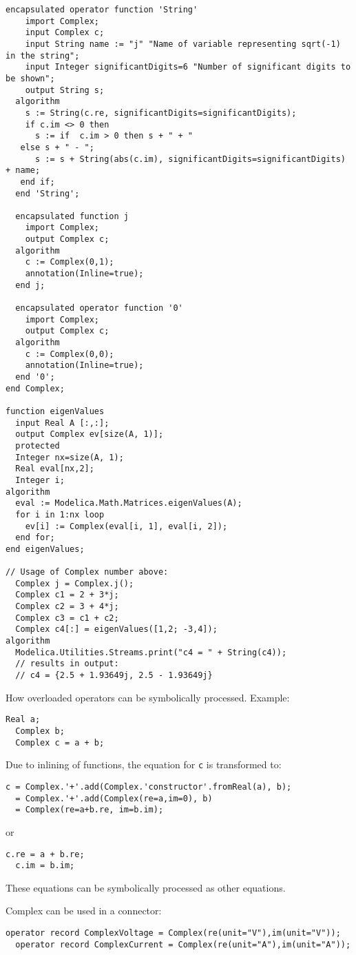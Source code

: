\begin{example}
\begin{lstlisting}[language=modelica,escapechar=!]
  encapsulated operator function 'String'
    import Complex;
    input Complex c;
    input String name := "j" "Name of variable representing sqrt(-1) in the string";
    input Integer significantDigits=6 "Number of significant digits to be shown";
    output String s;
  algorithm
    s := String(c.re, significantDigits=significantDigits);
    if c.im <> 0 then
      s := if  c.im > 0 then s + " + "
   else s + " - ";
      s := s + String(abs(c.im), significantDigits=significantDigits) + name;
   end if;
  end 'String';

  encapsulated function j
    import Complex;
    output Complex c;
  algorithm
    c := Complex(0,1);
    annotation(Inline=true);
  end j;

  encapsulated operator function '0'
    import Complex;
    output Complex c;
  algorithm
    c := Complex(0,0);
    annotation(Inline=true);
  end '0';
end Complex;

function eigenValues
  input Real A [:,:];
  output Complex ev[size(A, 1)];
  protected
  Integer nx=size(A, 1);
  Real eval[nx,2];
  Integer i;
algorithm
  eval := Modelica.Math.Matrices.eigenValues(A);
  for i in 1:nx loop
    ev[i] := Complex(eval[i, 1], eval[i, 2]);
  end for;
end eigenValues;

// Usage of Complex number above:
  Complex j = Complex.j();
  Complex c1 = 2 + 3*j;
  Complex c2 = 3 + 4*j;
  Complex c3 = c1 + c2;
  Complex c4[:] = eigenValues([1,2; -3,4]);
algorithm
  Modelica.Utilities.Streams.print("c4 = " + String(c4));
  // results in output:
  // c4 = {2.5 + 1.93649j, 2.5 - 1.93649j}
\end{lstlisting}

How overloaded operators can be symbolically processed. Example:
\begin{lstlisting}[language=modelica]
  Real a;
  Complex b;
  Complex c = a + b;
\end{lstlisting}
Due to inlining of functions, the equation for \lstinline!c! is
transformed to:
\begin{lstlisting}[language=modelica]
c = Complex.'+'.add(Complex.'constructor'.fromReal(a), b);
  = Complex.'+'.add(Complex(re=a,im=0), b)
  = Complex(re=a+b.re, im=b.im);
\end{lstlisting}
or
\begin{lstlisting}[language=modelica]
  c.re = a + b.re;
  c.im = b.im;
\end{lstlisting}
These equations can be symbolically processed as other equations.

Complex can be used in a connector:
\begin{lstlisting}[language=modelica]
  operator record ComplexVoltage = Complex(re(unit="V"),im(unit="V"));
  operator record ComplexCurrent = Complex(re(unit="A"),im(unit="A"));


\end{lstlisting}
\end{example}
